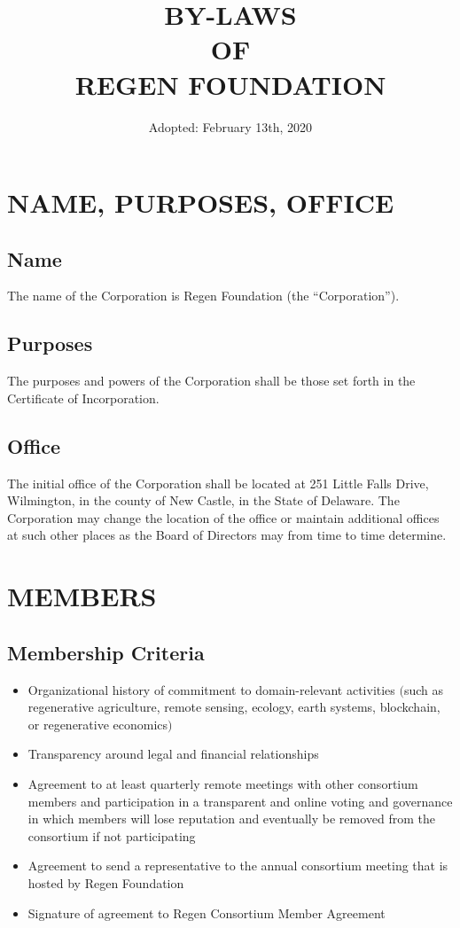\documentclass{article}
\begin{document}
\title{BY-LAWS \protect\\ OF \protect\\ REGEN FOUNDATION}
\author{ Adopted: February 13th, 2020}
\date{} 
\maketitle
\clearpage
\tableofcontents
\clearpage
\section{NAME, PURPOSES, OFFICE}
\subsection{Name}
The name of the Corporation is Regen Foundation (the “Corporation”).
\subsection{Purposes}
  The purposes and powers of the Corporation shall be those set forth in the Certificate of Incorporation.
\subsection{Office}
  The initial office of the Corporation shall be located at 251 Little Falls Drive, Wilmington, in the county of New Castle, in the State of Delaware.  The Corporation may change the location of the office or maintain additional offices at such other places as the Board of Directors may from time to time determine.
\section{MEMBERS}
\subsection{Membership Criteria}
\begin{itemize}
\item Organizational history of commitment to domain-relevant activities $($such as regenerative agriculture, remote sensing, ecology, earth systems, blockchain, or regenerative economics$)$
\item Transparency around legal and financial relationships
\item Agreement to at least quarterly remote meetings with other consortium members and participation in a transparent and online voting and governance in which members will lose reputation and eventually be removed from the consortium if not participating
\item Agreement to send a representative to the annual consortium meeting that is hosted by Regen Foundation
\item Signature of agreement to Regen Consortium Member Agreement
\end{itemize}
\end{document}
